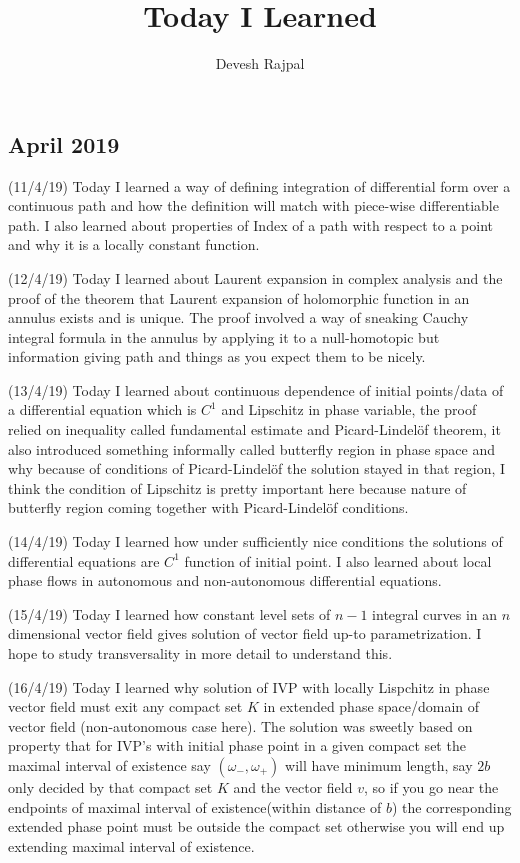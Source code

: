 \documentclass[12pt,a4paper]{article}
\title{\LARGE Today I Learned}
\author{\large Devesh Rajpal}
\date{}
\begin{document}
\maketitle
\subsection*{April 2019}


\quad (11/4/19) Today I learned a way of defining integration of differential form over a continuous path and how the definition will match with piece-wise differentiable path. I also learned about properties of Index of a path with respect to a point and why it is a locally constant function.

(12/4/19) Today I learned about Laurent expansion in complex analysis and the proof of the theorem that Laurent expansion of holomorphic function in an annulus exists and is unique. The proof involved a way of sneaking Cauchy integral formula in the annulus by applying it to a null-homotopic but information giving path and things as you expect them to be nicely.

(13/4/19) Today I learned about continuous dependence of initial points/data of a differential equation which is $C^1$ and Lipschitz in phase variable, the proof relied on inequality called fundamental estimate and Picard-Lindelöf theorem, it also introduced something informally called butterfly region in phase space and why because of conditions of Picard-Lindelöf the solution stayed in that region, I think the condition of Lipschitz is pretty important here because nature of butterfly region coming together with Picard-Lindelöf conditions.

(14/4/19) Today I learned how under sufficiently nice conditions the solutions of differential equations are $C^1$ function of initial point. I also learned about local phase flows in autonomous and non-autonomous differential equations.

(15/4/19) Today I learned how constant level sets of $n-1$ integral curves in an $n$ dimensional vector field gives solution of vector field up-to parametrization. I hope to study transversality in more detail to understand this.

(16/4/19) Today I learned why solution of IVP with locally Lispchitz in phase vector field must exit any compact set $K$ in extended phase space/domain of vector field (non-autonomous case here). The solution was sweetly based on property that for IVP's with initial phase point in a given compact set the maximal interval of existence say $(\omega_{-},\omega_{+})$ will have minimum length, say $2b$ only decided by that compact set $K$ and the vector field $v$, so if you go near the endpoints of maximal interval of existence(within distance of $b$) the corresponding extended phase point must be outside the compact set otherwise you will end up extending maximal interval of existence.
\end{document}
